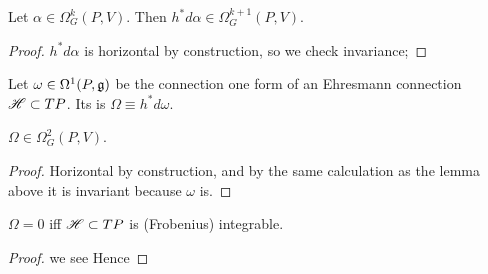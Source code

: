 \documentclass{article}
\begin{document}
\begin{lemma}
	Let $\alpha \in \Omega^k_G(P,V)$. Then $h^\ast d\alpha \in \Omega^{k+1}_G(P,V)$. 
\end{lemma}
\begin{proof}
	$h^\ast d\alpha$ is horizontal by construction, so we check invariance; 
\end{proof}

\begin{definition}
	Let $\omega \in \Omega^1(P,\mathfrak{g})$ be the connection one form of an Ehresmann connection $\mathscr{H} \subset TP$. Its  is $\Omega \equiv h^\ast d\omega$. 
\end{definition}

\begin{lemma}
	$\Omega \in \Omega^2_G(P,V)$. 
\end{lemma}
\begin{proof}
	Horizontal by construction, and by the same calculation as the lemma above it is invariant because $\omega$ is. 
\end{proof}

\begin{prop}
	$\Omega=0$ iff $\mathscr{H} \subset TP$ is (Frobenius) integrable.  
\end{prop}
\begin{proof}
	we see
	Hence 
\end{proof}
\end{document}
